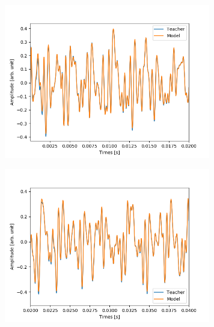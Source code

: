 \documentclass{jreport}		%
\begin{document}
\begin{figure}[htbp]
 \begin{minipage}{0.5\hsize}
 \begin{center}
  \includegraphics[width=90mm]{gain5_output_hikaku.png}
 \end{center}
 \label{fig:one}
 \end{minipage}
 \begin{minipage}{0.5\hsize}
 \begin{center}
  \includegraphics[width=90mm]{gain5_output_hikaku2.png}
 \end{center}
 \label{fig:two}
 \end{minipage}
\end{figure}
\end{document}
